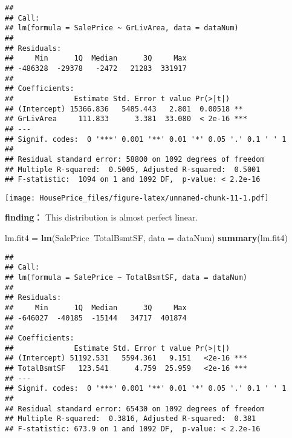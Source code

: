 \documentclass[]{article}
\newenvironment{Shaded}{\begin{snugshade}}{\end{snugshade}}
\newcommand{\KeywordTok}[1]{\textcolor[rgb]{0.13,0.29,0.53}{\textbf{#1}}}
\newcommand{\DataTypeTok}[1]{\textcolor[rgb]{0.13,0.29,0.53}{#1}}
\newcommand{\DecValTok}[1]{\textcolor[rgb]{0.00,0.00,0.81}{#1}}
\newcommand{\StringTok}[1]{\textcolor[rgb]{0.31,0.60,0.02}{#1}}
\newcommand{\OperatorTok}[1]{\textcolor[rgb]{0.81,0.36,0.00}{\textbf{#1}}}
\newcommand{\NormalTok}[1]{#1}
\begin{document}
\begin{verbatim}
## 
## Call:
## lm(formula = SalePrice ~ GrLivArea, data = dataNum)
## 
## Residuals:
##     Min      1Q  Median      3Q     Max 
## -486328  -29378   -2472   21283  331917 
## 
## Coefficients:
##              Estimate Std. Error t value Pr(>|t|)    
## (Intercept) 15366.836   5485.443   2.801  0.00518 ** 
## GrLivArea     111.833      3.381  33.080  < 2e-16 ***
## ---
## Signif. codes:  0 '***' 0.001 '**' 0.01 '*' 0.05 '.' 0.1 ' ' 1
## 
## Residual standard error: 58800 on 1092 degrees of freedom
## Multiple R-squared:  0.5005, Adjusted R-squared:  0.5001 
## F-statistic:  1094 on 1 and 1092 DF,  p-value: < 2.2e-16
\end{verbatim}

\begin{Shaded}
\end{Shaded}

\texttt{[image: HousePrice\_files/figure-latex/unnamed-chunk-11-1.pdf]}

\textbf{finding}： This distribution is almost perfect linear.

\begin{Shaded}
\begin{Highlighting}[]
\NormalTok{lm.fit4 =}\StringTok{ }\KeywordTok{lm}\NormalTok{(SalePrice}\OperatorTok{~}\NormalTok{TotalBsmtSF, }\DataTypeTok{data =}\NormalTok{ dataNum)}
\KeywordTok{summary}\NormalTok{(lm.fit4)}
\end{Highlighting}
\end{Shaded}

\begin{verbatim}
## 
## Call:
## lm(formula = SalePrice ~ TotalBsmtSF, data = dataNum)
## 
## Residuals:
##     Min      1Q  Median      3Q     Max 
## -646027  -40185  -15144   34717  401874 
## 
## Coefficients:
##              Estimate Std. Error t value Pr(>|t|)    
## (Intercept) 51192.531   5594.361   9.151   <2e-16 ***
## TotalBsmtSF   123.541      4.759  25.959   <2e-16 ***
## ---
## Signif. codes:  0 '***' 0.001 '**' 0.01 '*' 0.05 '.' 0.1 ' ' 1
## 
## Residual standard error: 65430 on 1092 degrees of freedom
## Multiple R-squared:  0.3816, Adjusted R-squared:  0.381 
## F-statistic: 673.9 on 1 and 1092 DF,  p-value: < 2.2e-16
\end{verbatim}
\end{document}
